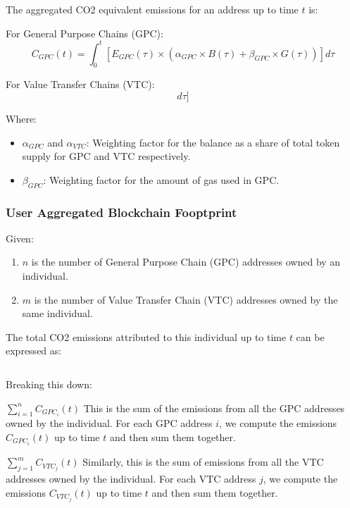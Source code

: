 \documentclass[12pt,a4paper]{report}
\begin{document}
The aggregated CO2 equivalent emissions for an address up to time $t$ is:

For General Purpose Chains (GPC):
\begin{equation}
    C_{GPC}(t) = \int_{0}^{t} [E_{GPC}(\tau) \times (\alpha_{GPC} \times B(\tau) + \beta_{GPC} \times G(\tau))] d\tau
\end{equation}

For Value Transfer Chains (VTC):
\begin{equation}
    [ C_{VTC}(t) = \int_{0}^{t} [E_{VTC}(\tau) \times (\alpha_{VTC} \times B(\tau) + \gamma_{VTC} \times T(\tau))] d\tau ]
\end{equation}

Where:
\begin{itemize}
    \item $\alpha_{GPC}$ and $\alpha_{VTC}$: Weighting factor for the balance as a share of total token supply for GPC and VTC respectively.
    \item $\beta_{GPC}$: Weighting factor for the amount of gas used in GPC.
\end{itemize}

\subsubsection{User Aggregated Blockchain Fooptprint}

Given:
\begin{enumerate}
    \item  \( n \) is the number of General Purpose Chain (GPC) addresses owned by an individual.
    \item \( m \) is the number of Value Transfer Chain (VTC) addresses owned by the same individual.
\end{enumerate}

The total CO2 emissions attributed to this individual up to time \( t \) can be expressed as:

\begin{equation}
    [ C_{total}(t) = \sum_{i=1}^{n} C_{GPC_i}(t) + \sum_{j=1}^{m} C_{VTC_j}(t) ]
\end{equation}

Breaking this down: \\
\boldmath
\begin{description}
    \item \( \sum_{i=1}^{n} C_{GPC_i}(t) \)
          This is the sum of the emissions from all the GPC addresses owned by the individual. For each GPC address \( i \), we compute the emissions \( C_{GPC_i}(t) \) up to time \( t \) and then sum them together.
    \item \( \sum_{j=1}^{m} C_{VTC_j}(t) \)
          Similarly, this is the sum of emissions from all the VTC addresses owned by the individual. For each VTC address \( j \), we compute the emissions \( C_{VTC_j}(t) \) up to time \( t \) and then sum them together.

\end{description}
\unboldmath
\end{document}
